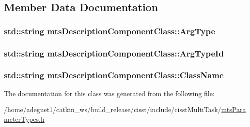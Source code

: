 \subsection{Member Data Documentation}
\hypertarget{classmts_description_component_class_a4d5ca1ccc8a6d825f42bea34a5f393b7}{
\subsubsection[{Arg\-Type}]{\setlength{\rightskip}{0pt plus 5cm}std\-::string mts\-Description\-Component\-Class\-::\-Arg\-Type}}\label{classmts_description_component_class_a4d5ca1ccc8a6d825f42bea34a5f393b7}
\hypertarget{classmts_description_component_class_a79919df2a4fa1d5d201e2909ac84ebde}{
\subsubsection[{Arg\-Type\-Id}]{\setlength{\rightskip}{0pt plus 5cm}std\-::string mts\-Description\-Component\-Class\-::\-Arg\-Type\-Id}}\label{classmts_description_component_class_a79919df2a4fa1d5d201e2909ac84ebde}
\hypertarget{classmts_description_component_class_a21979fdd472f25ebc71fe20e9389f41f}{
\subsubsection[{Class\-Name}]{\setlength{\rightskip}{0pt plus 5cm}std\-::string mts\-Description\-Component\-Class\-::\-Class\-Name}}\label{classmts_description_component_class_a21979fdd472f25ebc71fe20e9389f41f}


The documentation for this class was generated from the following file\-:\begin{DoxyCompactItemize}
\item 
/home/adeguet1/catkin\-\_\-ws/build\-\_\-release/cisst/include/cisst\-Multi\-Task/\hyperlink{mts_parameter_types_8h}{mts\-Parameter\-Types.\-h}\end{DoxyCompactItemize}
